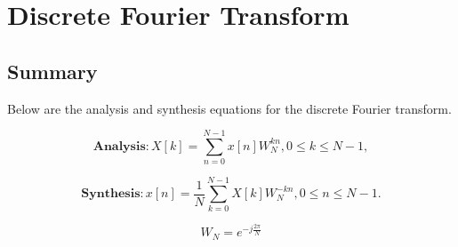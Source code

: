 \chapter{Discrete Fourier Transform}

\section{Summary}
Below are the analysis and synthesis equations for the discrete Fourier transform.

\begin{equation}
	\textbf{Analysis}: X[k] = \sum_{n = 0}^{N - 1} x[n]W_N^{kn}, 0 \leq k \leq N - 1,
\end{equation}

\begin{equation}
	\textbf{Synthesis}: x[n] = \frac{1}{N} \sum_{k = 0}^{N - 1} X[k]W_N^{-kn}, 0 \leq n \leq N - 1.
\end{equation}

\begin{equation}
	W_N = e ^ {-j \frac{2 \pi}{N}}
\end{equation}



